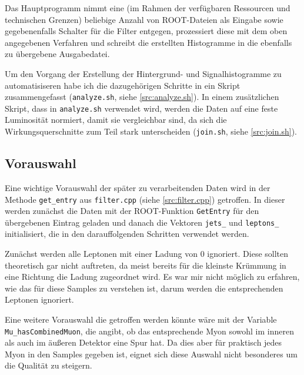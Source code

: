 Das Hauptprogramm nimmt eine (im Rahmen der verfügbaren Ressourcen und
technischen Grenzen) beliebige Anzahl von ROOT-Dateien als Eingabe sowie
gegebenenfalls Schalter für die Filter entgegen, prozessiert diese mit dem oben
angegebenen Verfahren und schreibt die erstellten Histogramme in die ebenfalls
zu übergebene Ausgabedatei.

Um den Vorgang der Erstellung der Hintergrund- und Signalhistogramme zu
automatisiseren habe ich die dazugehörigen Schritte in ein Skript
zusammengefasst (\verb'analyze.sh', siehe \ref{src:analyze.sh}). In einem
zusätzlichen Skript, dass in \verb'analyze.sh' verwendet wird, werden die Daten
auf eine feste Luminosität normiert, damit sie vergleichbar sind, da sich die
Wirkungsquerschnitte zum Teil stark unterscheiden (\verb'join.sh', siehe
\ref{src:join.sh}).

\subsection{Vorauswahl}
\label{cha:vorauswahl}
Eine wichtige Vorauswahl der später zu verarbeitenden Daten wird in der Methode
\lstinline'get_entry' aus \verb'filter.cpp' (siehe \ref{src:filter.cpp})
getroffen. In dieser werden zunächst die Daten mit der ROOT-Funktion
\lstinline'GetEntry' für den übergebenen Eintrag geladen und danach die Vektoren
\lstinline'jets_' und \lstinline'leptons_' initialisiert, die in den
darauffolgenden Schritten verwendet werden.

Zunächst werden alle Leptonen mit einer Ladung von $0$ ignoriert. Diese sollten
theoretisch gar nicht auftreten, da meist bereits für die kleinste Krümmung in
eine Richtung die Ladung zugeordnet wird. Es war mir nicht möglich zu erfahren,
wie das für diese Samples zu verstehen ist, darum werden die entsprechenden
Leptonen ignoriert.

Eine weitere Vorauswahl die getroffen werden könnte wäre mit der Variable
\lstinline'Mu_hasCombinedMuon', die angibt, ob das entsprechende Myon sowohl im
inneren als auch im äußeren Detektor eine Spur hat. Da dies aber für praktisch
jedes Myon in den Samples gegeben ist, eignet sich diese Auswahl nicht
besonderes um die Qualität zu steigern.

